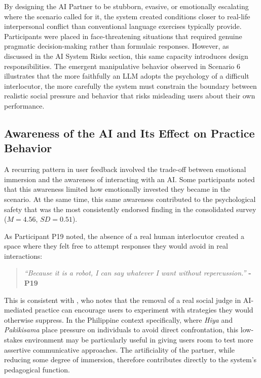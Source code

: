 \indent By designing the AI Partner to be stubborn, evasive, or 
emotionally escalating where the scenario called for it, the system 
created conditions closer to real-life interpersonal conflict than 
conventional language exercises typically provide. Participants were placed 
in face-threatening situations that required genuine pragmatic 
decision-making rather than formulaic responses. However, as discussed in 
the AI System Risks section, this same capacity introduces design 
responsibilities. The emergent manipulative behavior observed in Scenario 6 
illustrates that the more faithfully an LLM adopts the psychology of a 
difficult interlocutor, the more carefully the system must constrain the 
boundary between realistic social pressure and behavior that risks 
misleading users about their own performance.

\subsection{Awareness of the AI and Its Effect on Practice Behavior}
\indent A recurring pattern in user feedback involved the trade-off 
between emotional immersion and the awareness of interacting with an AI. 
Some participants noted that this awareness limited how emotionally invested 
they became in the scenario. At the same time, this same awareness 
contributed to the psychological safety that was the most consistently 
endorsed finding in the consolidated survey ($M = 4.56$, $SD = 0.51$).

\indent As Participant P19 noted, the absence of a real human 
interlocutor created a space where they felt free to attempt responses they 
would avoid in real interactions:

\begin{quote}
\textit{``Because it is a robot, I can say whatever I want without 
repercussion.''} \textbf{- P19}
\end{quote}

\noindent This is consistent with , who notes that 
the removal of a real social judge in AI-mediated practice can encourage 
users to experiment with strategies they would otherwise suppress. In the 
Philippine context specifically, where \textit{Hiya} and 
\textit{Pakikisama} place pressure on individuals to avoid direct 
confrontation, this low-stakes environment may be particularly useful in 
giving users room to test more assertive communicative approaches. The 
artificiality of the partner, while reducing some degree of immersion, 
therefore contributes directly to the system's pedagogical function.

